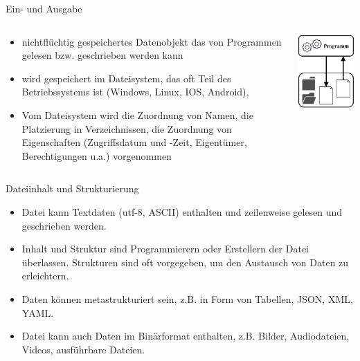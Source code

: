 \documentclass[xelatex,aspectratio=169]{beamer}
\begin{document}
\begin{frame}{Ein- und Ausgabe}
    \begin{columns}[T]
        \begin{column}{0.5\textwidth}
            \begin{itemize}
                \item nichtflüchtig gespeichertes Datenobjekt das von Programmen gelesen bzw. geschrieben werden kann
                \item wird gespeichert im Dateisystem, das oft Teil des Betriebssystems ist (Windows, Linux, IOS, Android),
                \item Vom Dateisystem wird die Zuordnung von Namen, die Platzierung in Verzeichnissen, die Zuordnung von Eigenschaften (Zugriffsdatum und -Zeit, Eigentümer, Berechtigungen u.a.) vorgenommen
            \end{itemize}
        \end{column}
        \begin{column}{0.5\textwidth}
            \centering
            \includegraphics[height=.7\textheight]{fig/io_basic.pdf}
        \end{column}
    \end{columns}
\end{frame}

\begin{frame}{Dateiinhalt und Strukturierung}
    \begin{itemize}
        \item Datei kann Textdaten (utf-8, ASCII) enthalten und zeilenweise gelesen und geschrieben werden.
        \item Inhalt und Struktur sind Programmierern oder Erstellern der Datei überlassen. Strukturen sind oft vorgegeben, um den Austausch von Daten zu erleichtern.
        \item Daten können metastrukturiert sein, z.B. in Form von Tabellen, JSON, XML, YAML.
        \item Datei kann auch Daten im Binärformat enthalten, z.B. Bilder, Audiodateien, Videos, ausführbare Dateien.
    \end{itemize}

\end{frame}
\end{document}
